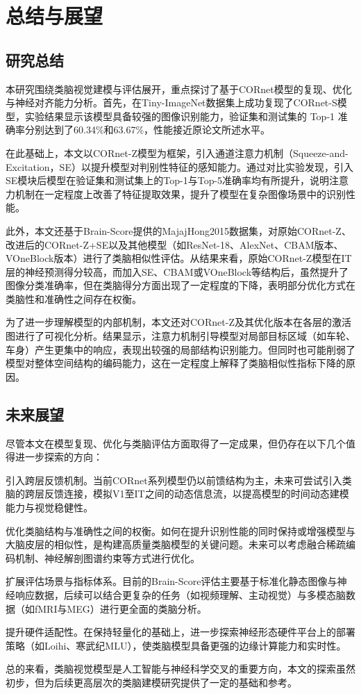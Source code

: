 \chapter{总结与展望}

\section{研究总结}

本研究围绕类脑视觉建模与评估展开，重点探讨了基于CORnet模型的复现、优化与神经对齐能力分析。首先，在Tiny-ImageNet数据集上成功复现了CORnet-S模型，实验结果显示该模型具备较强的图像识别能力，验证集和测试集的 Top-1 准确率分别达到了60.34\%和63.67\%，性能接近原论文所述水平。

在此基础上，本文以CORnet-Z模型为框架，引入通道注意力机制（Squeeze-and-Excitation，SE）以提升模型对判别性特征的感知能力。通过对比实验发现，引入SE模块后模型在验证集和测试集上的Top-1与Top-5准确率均有所提升，说明注意力机制在一定程度上改善了特征提取效果，提升了模型在复杂图像场景中的识别性能。

此外，本文还基于Brain-Score提供的MajajHong2015数据集，对原始CORnet-Z、改进后的CORnet-Z+SE以及其他模型（如ResNet-18、AlexNet、CBAM版本、VOneBlock版本）进行了类脑相似性评估。从结果来看，原始CORnet-Z模型在IT层的神经预测得分较高，而加入SE、CBAM或VOneBlock等结构后，虽然提升了图像分类准确率，但在类脑得分方面出现了一定程度的下降，表明部分优化方式在类脑性和准确性之间存在权衡。

为了进一步理解模型的内部机制，本文还对CORnet-Z及其优化版本在各层的激活图进行了可视化分析。结果显示，注意力机制引导模型对局部目标区域（如车轮、车身）产生更集中的响应，表现出较强的局部结构识别能力。但同时也可能削弱了模型对整体空间结构的编码能力，这在一定程度上解释了类脑相似性指标下降的原因。

\section{未来展望}

尽管本文在模型复现、优化与类脑评估方面取得了一定成果，但仍存在以下几个值得进一步探索的方向：

引入跨层反馈机制。当前CORnet系列模型仍以前馈结构为主，未来可尝试引入类脑的跨层反馈连接，模拟V1至IT之间的动态信息流，以提高模型的时间动态建模能力与视觉稳健性。

优化类脑结构与准确性之间的权衡。如何在提升识别性能的同时保持或增强模型与大脑皮层的相似性，是构建高质量类脑模型的关键问题。未来可以考虑融合稀疏编码机制、神经解剖图谱约束等方式进行优化。

扩展评估场景与指标体系。目前的Brain-Score评估主要基于标准化静态图像与神经响应数据，后续可以结合更复杂的任务（如视频理解、主动视觉）与多模态脑数据（如fMRI与MEG）进行更全面的类脑分析。

提升硬件适配性。在保持轻量化的基础上，进一步探索神经形态硬件平台上的部署策略（如Loihi、寒武纪MLU），使类脑模型具备更强的边缘计算能力和实时性。

总的来看，类脑视觉模型是人工智能与神经科学交叉的重要方向，本文的探索虽然初步，但为后续更高层次的类脑建模研究提供了一定的基础和参考。
